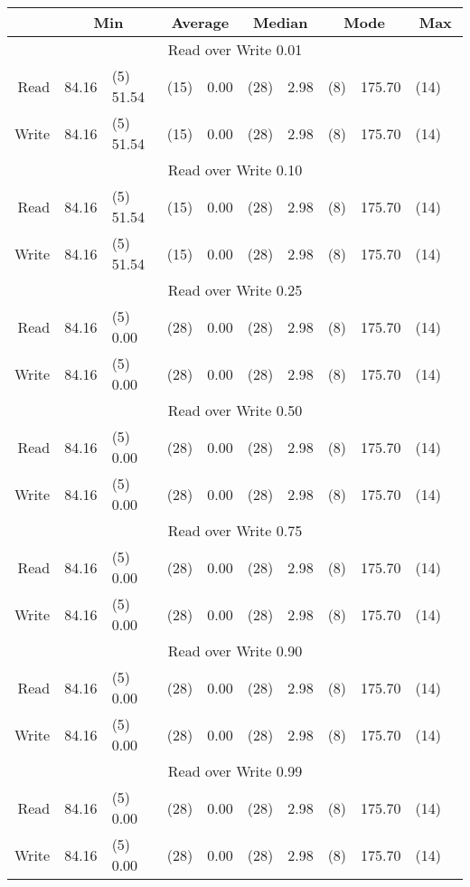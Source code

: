 

\begin{tabular}{r | r l | r l | r l | r l | r l}
& \multicolumn{2}{c|}{Min} & %
	\multicolumn{2}{c|}{Average} & %
	\multicolumn{2}{c|}{Median} & %
	\multicolumn{2}{c|}{Mode} & %
	\multicolumn{2}{c}{Max} \\ \hline
\multicolumn{11}{c}{Read over Write 0.01} \\ \hline
Read & 84.16 & (5) 51.54 & (15) & 0.00 & (28) & 2.98 & (8) & 175.70 & (14) \\
Write & 84.16 & (5) 51.54 & (15) & 0.00 & (28) & 2.98 & (8) & 175.70 & (14) \\ \hline
\multicolumn{11}{c}{Read over Write 0.10} \\ \hline
Read & 84.16 & (5) 51.54 & (15) & 0.00 & (28) & 2.98 & (8) & 175.70 & (14) \\
Write & 84.16 & (5) 51.54 & (15) & 0.00 & (28) & 2.98 & (8) & 175.70 & (14) \\ \hline
\multicolumn{11}{c}{Read over Write 0.25} \\ \hline
Read & 84.16 & (5) 0.00 & (28) & 0.00 & (28) & 2.98 & (8) & 175.70 & (14) \\
Write & 84.16 & (5) 0.00 & (28) & 0.00 & (28) & 2.98 & (8) & 175.70 & (14) \\ \hline
\multicolumn{11}{c}{Read over Write 0.50} \\ \hline
Read & 84.16 & (5) 0.00 & (28) & 0.00 & (28) & 2.98 & (8) & 175.70 & (14) \\
Write & 84.16 & (5) 0.00 & (28) & 0.00 & (28) & 2.98 & (8) & 175.70 & (14) \\ \hline
\multicolumn{11}{c}{Read over Write 0.75} \\ \hline
Read & 84.16 & (5) 0.00 & (28) & 0.00 & (28) & 2.98 & (8) & 175.70 & (14) \\
Write & 84.16 & (5) 0.00 & (28) & 0.00 & (28) & 2.98 & (8) & 175.70 & (14) \\ \hline
\multicolumn{11}{c}{Read over Write 0.90} \\ \hline
Read & 84.16 & (5) 0.00 & (28) & 0.00 & (28) & 2.98 & (8) & 175.70 & (14) \\
Write & 84.16 & (5) 0.00 & (28) & 0.00 & (28) & 2.98 & (8) & 175.70 & (14) \\ \hline
\multicolumn{11}{c}{Read over Write 0.99} \\ \hline
Read & 84.16 & (5) 0.00 & (28) & 0.00 & (28) & 2.98 & (8) & 175.70 & (14) \\
Write & 84.16 & (5) 0.00 & (28) & 0.00 & (28) & 2.98 & (8) & 175.70 & (14) \\ \hline


\end{tabular}

